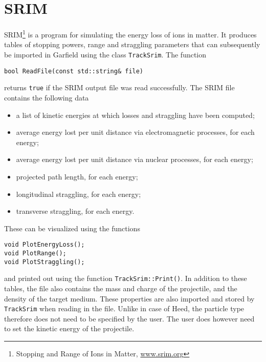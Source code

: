 \section{SRIM}
SRIM\footnote{Stopping and Range of Ions in Matter, \href{www.srim.org}{www.srim.org}} is a program for simulating the energy loss of ions in matter. 
It produces tables of stopping powers, range and straggling parameters that 
can subsequently be imported in Garfield using the class \texttt{TrackSrim}. 
The function
\begin{lstlisting}
bool ReadFile(const std::string& file)
\end{lstlisting}
returns \texttt{true} if the SRIM output file was read successfully.
The SRIM file contains the following data
\begin{itemize}
\item
a list of kinetic energies at which losses and straggling have been computed;
\item
average energy lost per unit distance via electromagnetic processes, for each energy;
\item
average energy lost per unit distance via nuclear processes, for each energy;
\item
projected path length, for each energy;
\item
longitudinal straggling, for each energy;
\item
transverse straggling, for each energy.
\end{itemize}
These can be visualized using the functions
\begin{lstlisting}
void PlotEnergyLoss();
void PlotRange();
void PlotStraggling();
\end{lstlisting}
and printed out using the function \texttt{TrackSrim::Print()}.
In addition to these tables, the file also contains the mass and charge of 
the projectile, and the density of the target medium.
These properties are also imported and stored by \texttt{TrackSrim} 
when reading in the file. Unlike in case of Heed, the particle type 
therefore does not need to be specified by the user. 
The user does however need to set the kinetic energy of the projectile.

